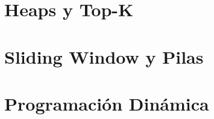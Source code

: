 \documentclass[11pt,oneside]{book}
\begin{document}
\chapter{Heaps y Top-K}







\chapter{Sliding Window y Pilas}






\chapter{Programación Dinámica}






\end{document}
